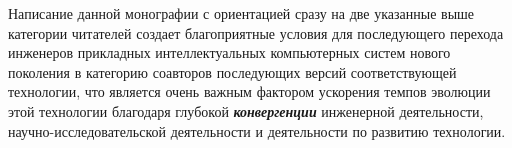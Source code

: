 \begin{partbacktext}
Написание данной монографии с ориентацией сразу на две указанные выше категории читателей создает благоприятные условия для последующего перехода инженеров прикладных интеллектуальных компьютерных систем нового поколения в категорию соавторов последующих версий соответствующей технологии, что является очень важным фактором ускорения темпов эволюции этой технологии благодаря глубокой \textbf{\textit{конвергенции}} инженерной деятельности, научно-исследовательской деятельности и деятельности по развитию технологии.

\end{partbacktext}